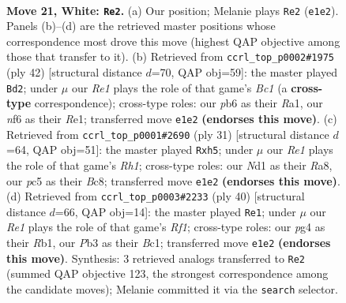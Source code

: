 \documentclass[11pt]{article}
\begin{document}
\clearpage

\begin{figure}[p]\centering
\begin{subfigure}{0.46\textwidth}\centering
\resizebox{\linewidth}{!}{%
\newchessgame
\chessboard[
  setfen={1nb2rk1/r5b1/1p3n2/p1p1p3/2P1p1p1/1P4P1/P2N1PB1/1RBNR1K1 w - - 0 21},
  showmover=false,
  pgfstyle=straightmove, color=movearrow, markmove={e1-e2}
]}
\caption{}
\end{subfigure}\hfill
\begin{subfigure}{0.46\textwidth}\centering
\resizebox{\linewidth}{!}{%
\newchessgame
\chessboard[
  setfen={r4rk1/pp2p1b1/4n2p/3pPppP/3P4/2P2N2/P4PP1/R1B1R1K1 w - - 0 22},
  showmover=false,
  pgfstyle=straightmove, color=movearrow, markmove={c1-d2}
]}
\caption{}
\end{subfigure}
\\[4pt]
\begin{subfigure}{0.46\textwidth}\centering
\resizebox{\linewidth}{!}{%
\newchessgame
\chessboard[
  setfen={r1b1k2r/1p1nnpp1/p3p3/3pP2P/3N1P2/P1P1B3/2P4P/2KR1B1R b kq - 0 16},
  showmover=false,
  pgfstyle=straightmove, color=movearrow, markmove={h8-h5}
]}
\caption{}
\end{subfigure}\hfill
\begin{subfigure}{0.46\textwidth}\centering
\resizebox{\linewidth}{!}{%
\newchessgame
\chessboard[
  setfen={r1br3k/pp4bp/2p1n1p1/2P3p1/N1B1P3/7P/P4PP1/1RB2RK1 w - - 0 21},
  showmover=false,
  pgfstyle=straightmove, color=movearrow, markmove={f1-e1}
]}
\caption{}
\end{subfigure}
\caption{\textbf{Move 21, White: \texttt{Re2}.} (a) Our position; Melanie plays \texttt{Re2} (\texttt{e1e2}). Panels (b)--(d) are the retrieved master positions whose correspondence most drove this move (highest QAP objective among those that transfer to it). (b) Retrieved from \texttt{ccrl\_top\_p0002\#1975} (ply 42) [structural distance $d$=70, QAP obj=59]: the master played \texttt{Bd2}; under $\mu$ our \emph{Re1} plays the role of that game's \emph{Bc1} (a \textbf{cross-type} correspondence); cross-type roles: our \emph{p}b6 as their \emph{R}a1, our \emph{n}f6 as their \emph{R}e1; transferred move \texttt{e1e2} \textbf{(endorses this move)}. (c) Retrieved from \texttt{ccrl\_top\_p0001\#2690} (ply 31) [structural distance $d$=64, QAP obj=51]: the master played \texttt{Rxh5}; under $\mu$ our \emph{Re1} plays the role of that game's \emph{Rh1}; cross-type roles: our \emph{N}d1 as their \emph{R}a8, our \emph{p}c5 as their \emph{B}c8; transferred move \texttt{e1e2} \textbf{(endorses this move)}. (d) Retrieved from \texttt{ccrl\_top\_p0003\#2233} (ply 40) [structural distance $d$=66, QAP obj=14]: the master played \texttt{Re1}; under $\mu$ our \emph{Re1} plays the role of that game's \emph{Rf1}; cross-type roles: our \emph{p}g4 as their \emph{R}b1, our \emph{P}b3 as their \emph{B}c1; transferred move \texttt{e1e2} \textbf{(endorses this move)}. Synthesis: 3 retrieved analogs transferred to \texttt{Re2} (summed QAP objective 123, the strongest correspondence among the candidate moves); Melanie committed it via the \texttt{search} selector.}
\label{fig:thought-m40}
\end{figure}
\end{document}
